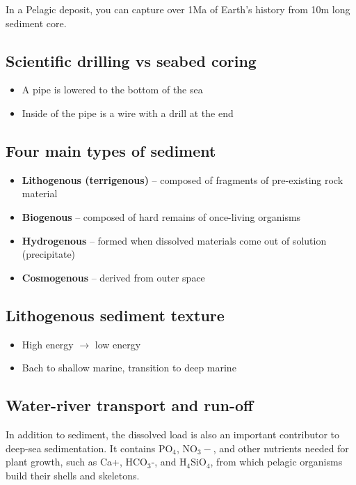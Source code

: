 In a Pelagic deposit, you can capture over 1Ma of Earth's history
from 10m long sediment core.

\subsection{Scientific drilling vs seabed coring}

\begin{itemize}
    \item A pipe is lowered to the bottom of the sea
    \item Inside of the pipe is a wire with a drill at the end
\end{itemize}

\subsection{Four main types of sediment}

\begin{itemize}
    \item \textbf{Lithogenous (terrigenous)} -- composed of fragments of
        pre-existing rock material
    \item \textbf{Biogenous} -- composed of hard remains of once-living
        organisms
    \item \textbf{Hydrogenous} -- formed when dissolved materials come out of
        solution (precipitate)
    \item \textbf{Cosmogenous} -- derived from outer space
\end{itemize}

\subsection{Lithogenous sediment texture}

\begin{itemize}
    \item High energy $\longrightarrow$ low energy
    \item Bach to shallow marine, transition to deep marine
\end{itemize}

\subsection{Water-river transport and run-off}

In addition to sediment, the dissolved load is also an important contributor
to deep-sea sedimentation. It contains PO$_4$, NO$_3-$, and other nutrients
needed for plant growth, such as Ca+, HCO$_3$-, and H$_4$SiO$_4$, from which
pelagic organisms build their shells and skeletons.

